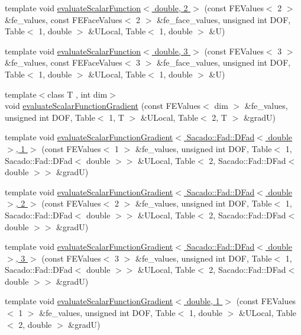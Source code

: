 \begin{DoxyCompactItemize}
\item 
template void \hyperlink{function_evaluations_8cc_a9d228a6175fb599a42cf7a0721ad2f32}{evaluate\-Scalar\-Function$<$ double, 2 $>$} (const F\-E\-Values$<$ 2 $>$ \&fe\-\_\-values, const F\-E\-Face\-Values$<$ 2 $>$ \&fe\-\_\-face\-\_\-values, unsigned int D\-O\-F, Table$<$ 1, double $>$ \&U\-Local, Table$<$ 1, double $>$ \&U)
\item 
template void \hyperlink{function_evaluations_8cc_ab0361b7dabb7d8e4edf83632ddb3129c}{evaluate\-Scalar\-Function$<$ double, 3 $>$} (const F\-E\-Values$<$ 3 $>$ \&fe\-\_\-values, const F\-E\-Face\-Values$<$ 3 $>$ \&fe\-\_\-face\-\_\-values, unsigned int D\-O\-F, Table$<$ 1, double $>$ \&U\-Local, Table$<$ 1, double $>$ \&U)
\item 
{\footnotesize template$<$class T , int dim$>$ }\\void \hyperlink{group___evaluation_functions_ga3ee6127c2c5c8333bb7fb384dcdb431f}{evaluate\-Scalar\-Function\-Gradient} (const F\-E\-Values$<$ dim $>$ \&fe\-\_\-values, unsigned int D\-O\-F, Table$<$ 1, T $>$ \&U\-Local, Table$<$ 2, T $>$ \&grad\-U)
\item 
template void \hyperlink{function_evaluations_8cc_ae408f77762afad2daeaa555239d1d38f}{evaluate\-Scalar\-Function\-Gradient$<$ Sacado\-::\-Fad\-::\-D\-Fad$<$ double $>$, 1 $>$} (const F\-E\-Values$<$ 1 $>$ \&fe\-\_\-values, unsigned int D\-O\-F, Table$<$ 1, Sacado\-::\-Fad\-::\-D\-Fad$<$ double $>$$>$ \&U\-Local, Table$<$ 2, Sacado\-::\-Fad\-::\-D\-Fad$<$ double $>$$>$ \&grad\-U)
\item 
template void \hyperlink{function_evaluations_8cc_a780341ff23fa9a724797a3963b5eb267}{evaluate\-Scalar\-Function\-Gradient$<$ Sacado\-::\-Fad\-::\-D\-Fad$<$ double $>$, 2 $>$} (const F\-E\-Values$<$ 2 $>$ \&fe\-\_\-values, unsigned int D\-O\-F, Table$<$ 1, Sacado\-::\-Fad\-::\-D\-Fad$<$ double $>$$>$ \&U\-Local, Table$<$ 2, Sacado\-::\-Fad\-::\-D\-Fad$<$ double $>$$>$ \&grad\-U)
\item 
template void \hyperlink{function_evaluations_8cc_a612155392eef7fae67e40615ddfce82a}{evaluate\-Scalar\-Function\-Gradient$<$ Sacado\-::\-Fad\-::\-D\-Fad$<$ double $>$, 3 $>$} (const F\-E\-Values$<$ 3 $>$ \&fe\-\_\-values, unsigned int D\-O\-F, Table$<$ 1, Sacado\-::\-Fad\-::\-D\-Fad$<$ double $>$$>$ \&U\-Local, Table$<$ 2, Sacado\-::\-Fad\-::\-D\-Fad$<$ double $>$$>$ \&grad\-U)
\item 
template void \hyperlink{function_evaluations_8cc_a778e8b0e56686ca05b7ae735ede7547d}{evaluate\-Scalar\-Function\-Gradient$<$ double, 1 $>$} (const F\-E\-Values$<$ 1 $>$ \&fe\-\_\-values, unsigned int D\-O\-F, Table$<$ 1, double $>$ \&U\-Local, Table$<$ 2, double $>$ \&grad\-U)

\end{DoxyCompactItemize}
